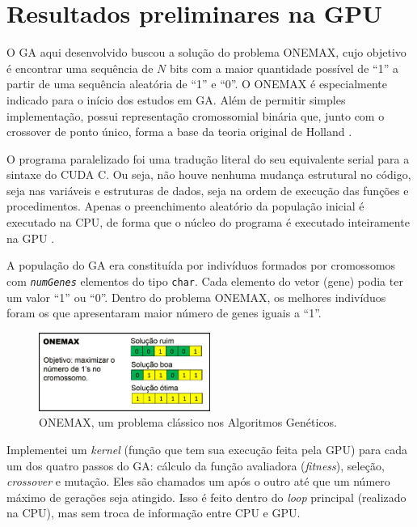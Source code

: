 	\section{Resultados preliminares na GPU}\label{sec:oneMaxNaGPU}
	
		O GA aqui desenvolvido buscou a solução do problema ONEMAX, cujo objetivo é encontrar uma sequência de $N$ bits com a maior quantidade possível de “1” a partir de uma sequência aleatória de “1” e “0”. O ONEMAX é especialmente indicado para o início dos estudos em GA. Além de permitir simples implementação, possui representação cromossomial binária que, junto com o crossover de ponto único, forma a base da teoria original de Holland \cite{Linden2008}.

	O programa paralelizado foi uma tradução literal do seu equivalente serial para a sintaxe do CUDA C. Ou seja, não houve nenhuma mudança estrutural no código, seja nas variáveis e estruturas de dados, seja na ordem de execução das funções e procedimentos. Apenas o preenchimento aleatório da população inicial é executado na CPU, de forma que o núcleo do programa é executado inteiramente na GPU \cite{onemaxNaGPU}. 

	A população do GA era constituída por indivíduos formados por cromossomos com \textit{\texttt{numGenes}} elementos do tipo \texttt{char}. Cada elemento do vetor (gene) podia ter um valor  “1” ou “0”. Dentro do problema ONEMAX, os melhores indivíduos foram os que apresentaram maior número de genes iguais a “1”.
		
	\begin{figure}[htbp]
		\centering
			\includegraphics[width=0.50\textwidth]{figs/resultados/onemax/onemax_objetivo.png}
		\caption{ONEMAX, um problema clássico nos Algoritmos Genéticos.}
		\label{fig:onemax_objetivo}
	\end{figure}
		
	Implementei um \emph{kernel} (função que tem sua execução feita pela GPU) para cada um dos quatro passos do GA: cálculo da função avaliadora (\emph{fitness}), seleção, \emph{crossover} e mutação. Eles são chamados um após o outro até que um número máximo de gerações seja atingido. Isso é feito dentro do \emph{loop} principal (realizado na CPU), mas sem troca de informação entre CPU e GPU.
	

